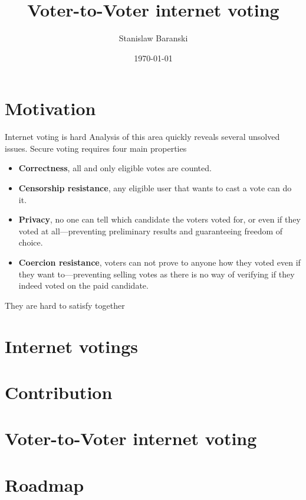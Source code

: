 \documentclass{beamer}
\title[Voter-to-Voter internet voting]{Voter-to-Voter internet voting}
\author{Stanislaw Baranski}
\date{\today}
\begin{document}
\pgtitleframe


\section{Motivation}

\begin{frame}{Internet voting is hard}
	Analysis of this area quickly reveals several unsolved issues.
	Secure voting requires four main properties

	\begin{itemize}
	\item<1-> \textbf{Correctness}, all and only eligible votes are counted.
	\item<2-> \textbf{Censorship resistance}, any eligible user that wants to cast a vote can do it.
	\item<3-> \textbf{Privacy}, no one can tell which candidate the voters voted for, or even if they voted at all—preventing preliminary results and guaranteeing freedom of choice.
	\item<4-> \textbf{Coercion resistance}, voters can not prove to anyone how they voted even if they want to—preventing selling votes as there is no way of verifying if they indeed voted on the paid candidate.
	\end{itemize}

	\pause
	They are hard to satisfy together
\end{frame}

\section{Internet votings}

\section{Contribution}

\section{Voter-to-Voter internet voting}

\section{Roadmap}

\pglastframe


\end{document}

